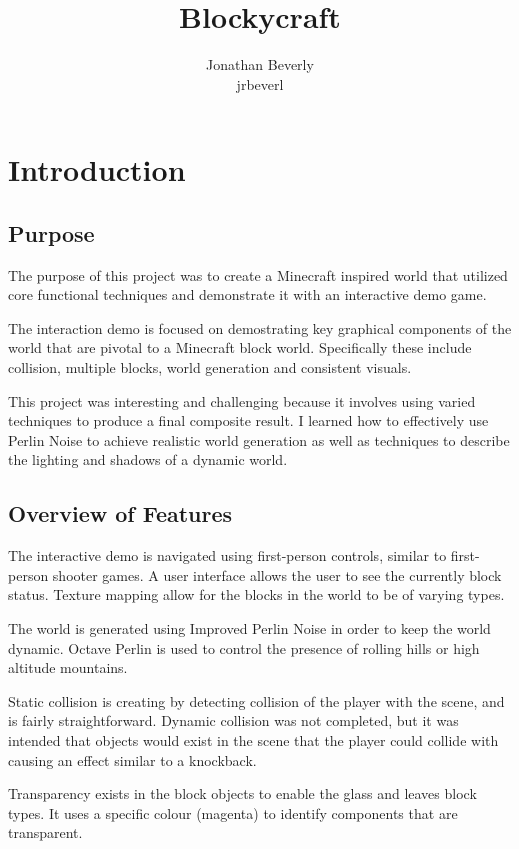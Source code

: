\documentclass{book}
\title{\huge Blockycraft}
\author{Jonathan Beverly \\ jrbeverl}
\begin{document}
\maketitle
\tableofcontents

\chapter{Introduction}
\section{Purpose}
The purpose of this project was to create a Minecraft inspired world that utilized core functional techniques and demonstrate it with an interactive demo game.
    
The interaction demo is focused on demostrating key graphical components of the world that are pivotal to a Minecraft block world.  Specifically these include collision, multiple blocks, world generation and consistent visuals.
    
This project was interesting and challenging because it involves using varied techniques to produce a final composite result. I learned how to effectively use Perlin Noise to achieve realistic world generation as well as techniques to describe the lighting and shadows of a dynamic world. 

\section{Overview of Features}
The interactive demo is navigated using first-person controls, similar to first-person shooter games.
A user interface allows the user to see the currently block status.  Texture mapping allow for the blocks in the world to be of varying types. 
    
The world is generated using Improved Perlin Noise in order to keep the world dynamic.  Octave Perlin is used to control the presence of rolling hills or high altitude mountains.

Static collision is creating by detecting collision of the player with the scene, and is fairly straightforward.  Dynamic collision was not completed, but it was intended that objects would exist in the scene that the player could collide with causing an effect similar to a knockback.  

Transparency exists in the block objects to enable the glass and leaves block types.  It uses a specific colour (magenta) to identify components that are transparent.
\end{document}
